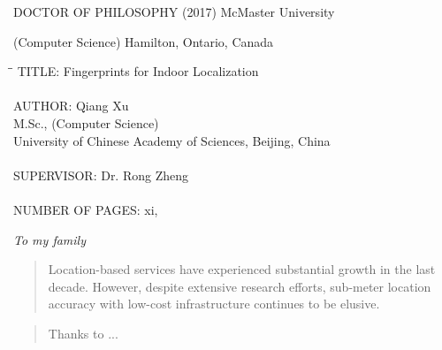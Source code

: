 \documentclass[letterpaper,12pt,twoside,openright]{report} %
\begin{document}
{
	\noindent DOCTOR OF PHILOSOPHY (2017) 
	\hfill
	McMaster University
	
	\noindent (Computer Science) 
	\hfill 
	Hamilton, Ontario, Canada
	
	\vspace{0.6in}
\begin{tabbing}
	\hspace*{5cm}\=\hspace*{1cm}\= \kill
	TITLE: \>  Fingerprints for Indoor Localization\\
	\\
	AUTHOR:\>  Qiang Xu\\
	\>M.Sc., (Computer Science)\\
	\>University of Chinese Academy of Sciences, Beijing, China\\
	\\
	SUPERVISOR:\> Dr. Rong Zheng\\
	\\
	NUMBER OF PAGES:\> xi,~\pageref{LastPage}
\end{tabbing}
}
\newpage
\thispagestyle{empty}
\null\vfill
\begin{center}
	\textsl{To my family}
\end{center}
\vfill
\begin{abstract}
\thispagestyle{plain} 
\setcounter{page}{4} 
Location-based services have experienced substantial growth in the last decade. However, despite extensive research efforts, sub-meter location accuracy with low-cost infrastructure continues to be elusive. 
\end{abstract}

\renewcommand{\abstractname}{Acknowledgements}
\begin{abstract} 
\setcounter{page}{6} 
\thispagestyle{plain}
Thanks to ...   
\end{abstract}
    
    \setcounter{secnumdepth}{4}
    \setcounter{tocdepth}{3}
    \tableofcontents %
    
    {\listoffigures \let\cleardoublepage\clearpage %
    	
    \printnomenclature
	} %
\end{document}
